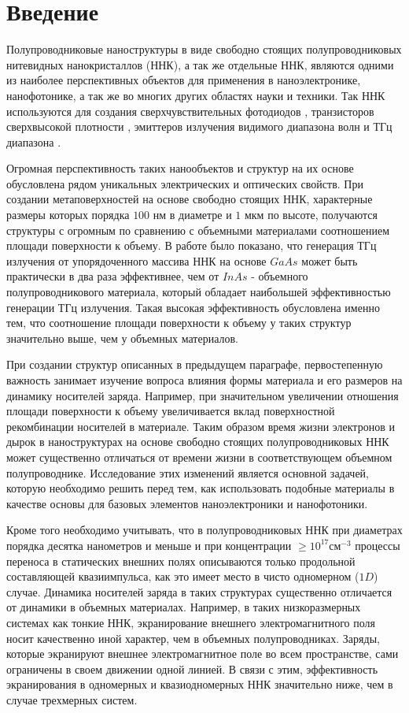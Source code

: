 \documentclass[a4paper,14pt,russian]{extreport}
\begin{document}
	\chapter{Введение}
		Полупроводниковые наноструктуры в виде свободно стоящих
полупроводниковых нитевидных нанокристаллов (ННК), а так же отдельные ННК, являются одними из наиболее перспективных объектов для применения в наноэлектронике,
нанофотонике, а так же во многих других областях науки и техники. Так ННК используются для создания
сверхчувствительных фотодиодов \cite{semicondNNW2006}, транзисторов сверхвысокой плотности \cite{NNWtransistors}, эмиттеров излучения видимого диапазона волн \cite{singleNNWlaser} и ТГц диапазона \cite{THzGeneration}.\par
Огромная перспективность таких нанообъектов и структур на их основе обусловлена рядом уникальных электрических и оптических свойств. При создании метаповерхностей на основе свободно стоящих ННК, характерные размеры которых порядка $100 \text{ нм}$ в диаметре и $1 \text{ мкм}$ по высоте, получаются структуры с огромным по сравнению с объемными материалами соотношением площади поверхности к объему. В работе \cite{THzGeneration} было показано, что генерация ТГц излучения от упорядоченного массива ННК на основе $GaAs$ может быть практически в два раза эффективнее, чем от $InAs$ - объемного полупроводникового материала, который обладает наибольшей эффективностью генерации ТГц излучения. Такая высокая эффективность обусловлена именно тем, что соотношение площади поверхности к объему у таких структур значительно выше, чем у объемных материалов.\par
 При создании структур описанных в предыдущем параграфе, первостепенную важность занимает изучение вопроса влияния формы материала и его размеров на динамику носителей заряда. Например, при значительном увеличении отношения площади поверхности к объему увеличивается вклад поверхностной рекомбинации носителей в материале. Таким образом время жизни электронов и дырок в наноструктурах на основе свободно стоящих полупроводниковых ННК может существенно отличаться от времени жизни в соответствующем объемном полупроводнике. Исследование этих изменений является основной задачей, которую необходимо решить перед тем, как использовать подобные материалы в качестве основы для базовых элементов наноэлектроники и нанофотоники.\par
Кроме того необходимо учитывать, что в полупроводниковых ННК при диаметрах порядка десятка нанометров и меньше и при концентрации $\geqslant 10^{17}\text{см}^{-3}$ процессы переноса в статических внешних полях описываются только продольной составляющей квазиимпульса, как это имеет место в
чисто одномерном ($1D$) случае. Динамика носителей заряда в таких структурах существенно отличается от динамики в объемных материалах. Например, в таких низкоразмерных системах как тонкие ННК, экранирование внешнего электромагнитного поля носит качественно иной характер, чем в объемных полупроводниках. Заряды, которые экранируют внешнее электромагнитное поле во всем пространстве, сами ограничены в своем движении одной линией. В связи с этим, эффективность экранирования в одномерных и квазиодномерных ННК значительно ниже, чем в случае трехмерных систем. 
\end{document}
